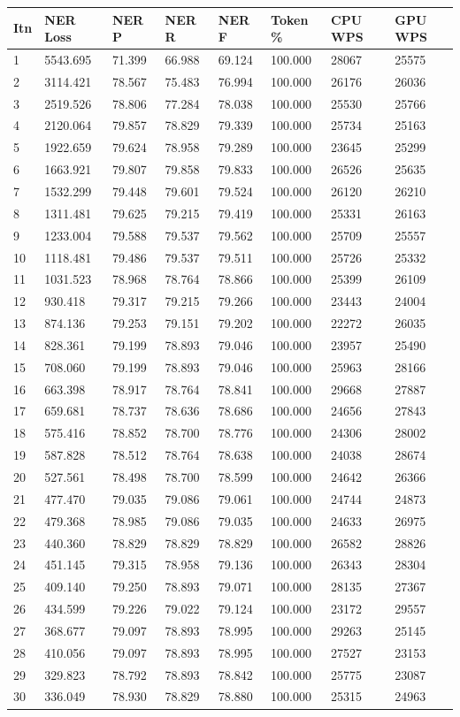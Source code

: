 \documentclass[12pt,a4paper,]{scrartcl}
\begin{document}
\begin{longtable}[]{@{}llllllll@{}}
\toprule
Itn & NER Loss & NER P & NER R & NER F & Token \% & CPU WPS & GPU WPS\tabularnewline
\midrule
\endhead
1 & 5543.695 & 71.399 & 66.988 & 69.124 & 100.000 & 28067 & 25575\tabularnewline
2 & 3114.421 & 78.567 & 75.483 & 76.994 & 100.000 & 26176 & 26036\tabularnewline
3 & 2519.526 & 78.806 & 77.284 & 78.038 & 100.000 & 25530 & 25766\tabularnewline
4 & 2120.064 & 79.857 & 78.829 & 79.339 & 100.000 & 25734 & 25163\tabularnewline
5 & 1922.659 & 79.624 & 78.958 & 79.289 & 100.000 & 23645 & 25299\tabularnewline
6 & 1663.921 & 79.807 & 79.858 & 79.833 & 100.000 & 26526 & 25635\tabularnewline
7 & 1532.299 & 79.448 & 79.601 & 79.524 & 100.000 & 26120 & 26210\tabularnewline
8 & 1311.481 & 79.625 & 79.215 & 79.419 & 100.000 & 25331 & 26163\tabularnewline
9 & 1233.004 & 79.588 & 79.537 & 79.562 & 100.000 & 25709 & 25557\tabularnewline
10 & 1118.481 & 79.486 & 79.537 & 79.511 & 100.000 & 25726 & 25332\tabularnewline
11 & 1031.523 & 78.968 & 78.764 & 78.866 & 100.000 & 25399 & 26109\tabularnewline
12 & 930.418 & 79.317 & 79.215 & 79.266 & 100.000 & 23443 & 24004\tabularnewline
13 & 874.136 & 79.253 & 79.151 & 79.202 & 100.000 & 22272 & 26035\tabularnewline
14 & 828.361 & 79.199 & 78.893 & 79.046 & 100.000 & 23957 & 25490\tabularnewline
15 & 708.060 & 79.199 & 78.893 & 79.046 & 100.000 & 25963 & 28166\tabularnewline
16 & 663.398 & 78.917 & 78.764 & 78.841 & 100.000 & 29668 & 27887\tabularnewline
17 & 659.681 & 78.737 & 78.636 & 78.686 & 100.000 & 24656 & 27843\tabularnewline
18 & 575.416 & 78.852 & 78.700 & 78.776 & 100.000 & 24306 & 28002\tabularnewline
19 & 587.828 & 78.512 & 78.764 & 78.638 & 100.000 & 24038 & 28674\tabularnewline
20 & 527.561 & 78.498 & 78.700 & 78.599 & 100.000 & 24642 & 26366\tabularnewline
21 & 477.470 & 79.035 & 79.086 & 79.061 & 100.000 & 24744 & 24873\tabularnewline
22 & 479.368 & 78.985 & 79.086 & 79.035 & 100.000 & 24633 & 26975\tabularnewline
23 & 440.360 & 78.829 & 78.829 & 78.829 & 100.000 & 26582 & 28826\tabularnewline
24 & 451.145 & 79.315 & 78.958 & 79.136 & 100.000 & 26343 & 28304\tabularnewline
25 & 409.140 & 79.250 & 78.893 & 79.071 & 100.000 & 28135 & 27367\tabularnewline
26 & 434.599 & 79.226 & 79.022 & 79.124 & 100.000 & 23172 & 29557\tabularnewline
27 & 368.677 & 79.097 & 78.893 & 78.995 & 100.000 & 29263 & 25145\tabularnewline
28 & 410.056 & 79.097 & 78.893 & 78.995 & 100.000 & 27527 & 23153\tabularnewline
29 & 329.823 & 78.792 & 78.893 & 78.842 & 100.000 & 25775 & 23087\tabularnewline
30 & 336.049 & 78.930 & 78.829 & 78.880 & 100.000 & 25315 & 24963\tabularnewline
\bottomrule
\end{longtable}
\end{document}
